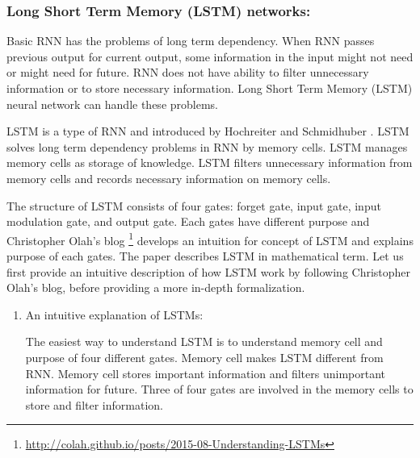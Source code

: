 \documentclass[draft,dvipsnames]{drexel-thesis}
\begin{document}
\begin{thesis}
	
\subsubsection{Long Short Term Memory (LSTM) networks:}\label{LSTM}
	Basic RNN has the problems of long term dependency. When RNN passes previous output for current output, some information in the input might not need or might need for future. RNN does not have ability to filter unnecessary information or to store necessary information. Long Short Term Memory (LSTM) neural network can handle these problems.
	
	LSTM is a type of RNN and introduced by Hochreiter and Schmidhuber \cite{hochreiter1997long}. LSTM solves long term dependency problems in RNN by memory cells. LSTM manages memory cells as storage of knowledge. LSTM filters unnecessary information from memory cells and records necessary information on memory cells.
	
	The structure of LSTM consists of four gates: forget gate, input gate, input modulation gate, and output gate. Each gates have different purpose and Christopher Olah's blog \footnote{\url{http://colah.github.io/posts/2015-08-Understanding-LSTMs}} develops an intuition for concept of LSTM and explains purpose of each gates. The paper \cite{zaremba2014recurrent}  describes LSTM in mathematical term. Let us first provide an intuitive description of how LSTM work by following Christopher Olah's blog, before providing a more in-depth formalization.
		

	
\begin{enumerate}
\item An intuitive explanation of LSTMs:
	
	The easiest way to understand LSTM is to understand memory cell and purpose of four different gates. Memory cell makes LSTM different from RNN. Memory cell stores important information and filters unimportant information for future. Three of four gates are involved in the memory cells to store and filter information.
		

\end{enumerate}
\end{thesis}
\end{document}
